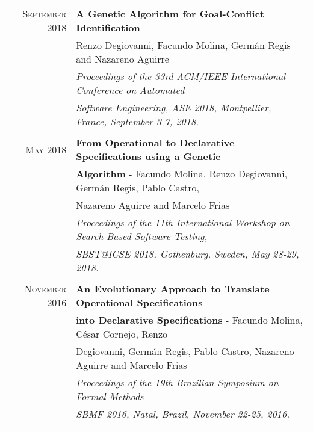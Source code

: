 \documentclass[a4paper,10pt]{article} %
\begin{document}
\begin{longtable}{rl}
\textsc{September} 2018  & \textbf{A Genetic Algorithm for Goal-Conflict Identification} \\ 
& Renzo Degiovanni, Facundo Molina, Germán Regis and Nazareno Aguirre \\
& \textit{Proceedings of the 33rd ACM/IEEE International Conference on Automated } \\
& \textit{Software Engineering, ASE 2018, Montpellier, France, September 3-7, 2018.} \\ & \\

\textsc{May} 2018  & \textbf{From Operational to Declarative Specifications using a Genetic} \\ & \textbf{Algorithm} - Facundo Molina, Renzo Degiovanni, Germán Regis, Pablo Castro,\\
& Nazareno Aguirre and Marcelo Frias \\
& \textit{Proceedings of the 11th International Workshop on Search-Based Software Testing,} \\
& \textit{SBST@ICSE 2018, Gothenburg, Sweden, May 28-29, 2018.} \\ & \\

\textsc{November} 2016 & \textbf{An Evolutionary Approach to Translate Operational Specifications} \\ & \textbf{into Declarative Specifications} - Facundo Molina, César Cornejo, Renzo \\
& Degiovanni, Germán Regis, Pablo Castro, Nazareno Aguirre and Marcelo Frias \\
& \textit{Proceedings of the 19th Brazilian Symposium on Formal Methods} \\ 
& \textit{SBMF 2016, Natal, Brazil, November 22-25, 2016.} \\ & \\

\end{longtable}
\end{document}
